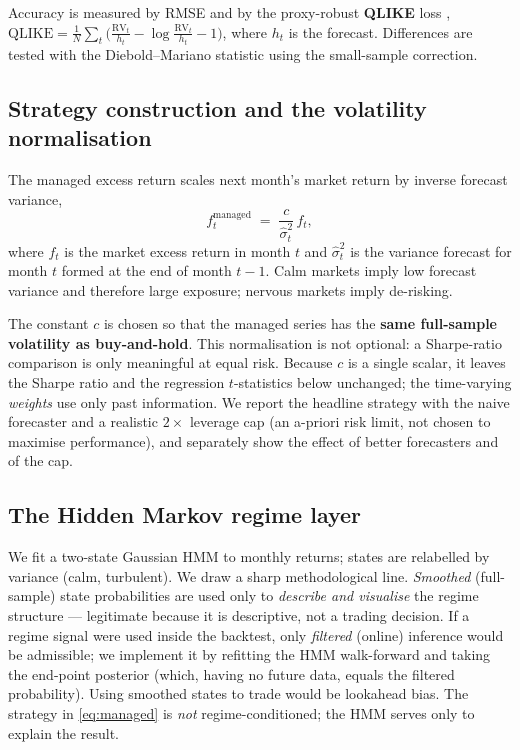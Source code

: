 \documentclass[11pt]{article}
\begin{document}
Accuracy is measured by RMSE and by the proxy-robust \textbf{QLIKE} loss
\citep{patton2011volatility},
\(\mathrm{QLIKE}=\tfrac1N\sum_t\big(\tfrac{\mathrm{RV}_t}{h_t}-\log\tfrac{\mathrm{RV}_t}{h_t}-1\big)\),
where $h_t$ is the forecast. Differences are tested with the Diebold--Mariano
statistic using the \citet{harvey1997testing} small-sample correction.

\subsection{Strategy construction and the volatility normalisation}

The managed excess return scales next month's market return by inverse forecast
variance,
\begin{equation}
  f^{\text{managed}}_{t} \;=\; \frac{c}{\widehat{\sigma}^2_{t}}\, f_{t},
  \label{eq:managed}
\end{equation}
where $f_t$ is the market excess return in month $t$ and $\widehat{\sigma}^2_t$
is the variance forecast for month $t$ formed at the end of month $t-1$. Calm
markets imply low forecast variance and therefore large exposure; nervous markets
imply de-risking.

The constant $c$ is chosen so that the managed series has the \textbf{same
full-sample volatility as buy-and-hold}. This normalisation is not optional: a
Sharpe-ratio comparison is only meaningful at equal risk. Because $c$ is a single
scalar, it leaves the Sharpe ratio and the regression $t$-statistics below
unchanged; the time-varying \emph{weights} use only past information. We report
the headline strategy with the naive forecaster and a realistic $2\times$
leverage cap (an a-priori risk limit, not chosen to maximise performance), and
separately show the effect of better forecasters and of the cap.

\subsection{The Hidden Markov regime layer}

We fit a two-state Gaussian HMM to monthly returns; states are relabelled by
variance (calm, turbulent). We draw a sharp methodological line. \emph{Smoothed}
(full-sample) state probabilities are used only to \emph{describe and visualise}
the regime structure --- legitimate because it is descriptive, not a trading
decision. If a regime signal were used inside the backtest, only \emph{filtered}
(online) inference would be admissible; we implement it by refitting the HMM
walk-forward and taking the end-point posterior (which, having no future data,
equals the filtered probability). Using smoothed states to trade would be
lookahead bias. The strategy in \eqref{eq:managed} is \emph{not}
regime-conditioned; the HMM serves only to explain the result.
\end{document}
